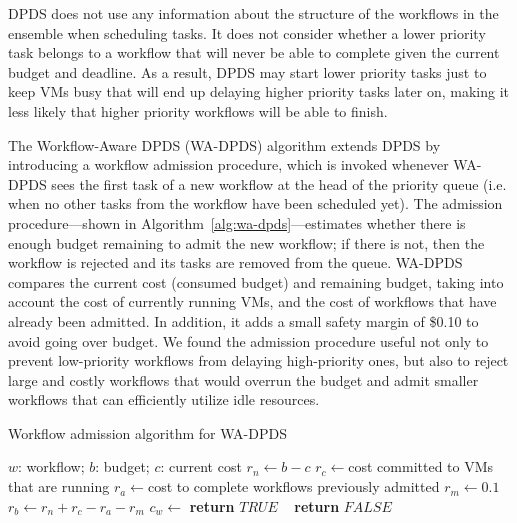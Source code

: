 \documentclass[conference]{IEEEtran}
\begin{document}
DPDS does not use any information about the structure of the
workflows in the ensemble when scheduling tasks.  It does not
consider whether a lower priority task belongs to a workflow that will never be
able to complete given the current budget and deadline. As a result, DPDS may
start lower priority tasks just to keep VMs busy that will end up delaying
higher priority tasks later on, making it less likely that higher priority
workflows will be able to finish.

The Workflow-Aware DPDS (WA-DPDS) algorithm
extends DPDS by introducing a workflow admission procedure, which is invoked whenever WA-DPDS sees the first task of a new workflow at
the head of the priority queue (i.e. when no other tasks from the workflow have
been scheduled yet). The admission procedure---shown in
Algorithm~\ref{alg:wa-dpds}---estimates whether there is enough budget remaining
to admit the new workflow; if there is not, then the workflow is rejected and
its tasks are removed from the queue. WA-DPDS compares the current cost
(consumed budget) and remaining budget, taking into account the cost of
currently running VMs, and the cost of workflows that have already been
admitted. In addition, it adds a small safety margin of \$0.10 to avoid going
over budget. We found the admission procedure useful
not only to prevent low-priority workflows from delaying high-priority ones, but
also to reject large and costly workflows that would overrun the budget and
admit smaller workflows that can efficiently utilize idle resources.



\begin{algorithm}[tb]
\caption{Workflow admission algorithm for WA-DPDS}
\label{alg:wa-dpds}
{\footnotesize
\begin{algorithmic}[1]
\Require $w$: workflow; $b$: budget; $c$: current cost
    \State $r_n\gets b-c$ 
    \State $r_c\gets $cost committed to VMs that are running
    \State $r_a\gets $cost to complete workflows previously admitted
  \State $r_m\gets 0.1$ 
  \State $r_b\gets r_n+r_c-r_a-r_m$ 
  \State $c_w\gets$ 
      \textbf{return} $TRUE$
    \Else ~  \textbf{return} $FALSE$
  \EndIf       
\EndProcedure
\end{algorithmic}
}
\end{algorithm}
\end{document}
